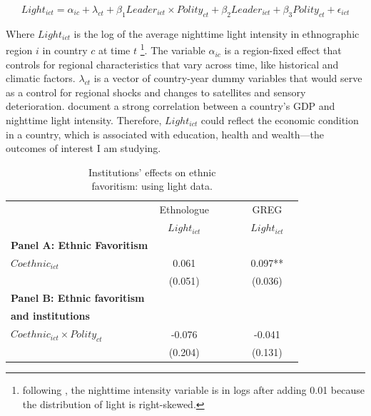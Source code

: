 \documentclass{wptemp}
\begin{document}
\begin{equation}\label{eq:hodler}
Light_{ict} = \alpha_{ic} + \lambda_{ct} + \beta_{1}Leader_{ict}\times Polity_{ct} + \beta_{2}Leader_{ict} + \beta_{3} Polity_{ct} + \epsilon_{ict}
\end{equation}

Where $Light_{ict}$ is the log of the average nighttime light intensity in ethnographic region $i$ in country $c$ at time $t$ \footnote{following \citet{henderson2012measuring,michalopoulos2014national,michalopoulos2013pre,hodler2014regional,hodler2014economic}, the nighttime intensity variable is in logs after adding 0.01 because the distribution of light is right-skewed.}. The variable $\alpha_{ic}$ is a region-fixed effect that controls for regional characteristics that vary across time, like historical and climatic factors. $\lambda_{ct}$ is a vector of country-year dummy variables that would serve as a control for regional shocks and changes to satellites and sensory deterioration. \citet{henderson2012measuring} document a strong correlation between a country's GDP and nighttime light intensity. Therefore, $Light_{ict}$ could reflect the economic condition in a country, which is associated with education, health and wealth---the outcomes of interest I am studying. 

\begin{center}
\begin{table}[H]
\centering
\caption{Institutions' effects on ethnic \\ favoritism: using light data.}
\label{tab:hodler}
\begin{tabular}{lcccccccc}
\hline 
 & \multicolumn{3}{c}{Ethnologue} &  &  & \multicolumn{3}{c}{GREG}\tabularnewline
\cline{2-4} \cline{7-9} 
 &  & $Light_{ict}$ &  &  &  &  & $Light_{ict}$ & \tabularnewline
\hline 
\textbf{Panel A: Ethnic Favoritism} &  &  &  &  &  &  &  & \tabularnewline
$Coethnic_{ict}$ &  & 0.061 &  &  &  &  & 0.097{**} & \tabularnewline
 &  & (0.051) &  &  &  &  & (0.036) & \tabularnewline
\textbf{Panel B: Ethnic favoritism} &  &  &  &  &  &  &  & \tabularnewline
\textbf{and institutions} &  &  &  &  &  &  &  & \tabularnewline
$Coethnic_{ict}\times Polity_{ct}$ &  & -0.076 &  &  &  &  & -0.041 & \tabularnewline
 &  & (0.204) &  &  &  &  & (0.131) & \tabularnewline
\hline 
\end{tabular}
\end{table}
\end{center}
\end{document}

